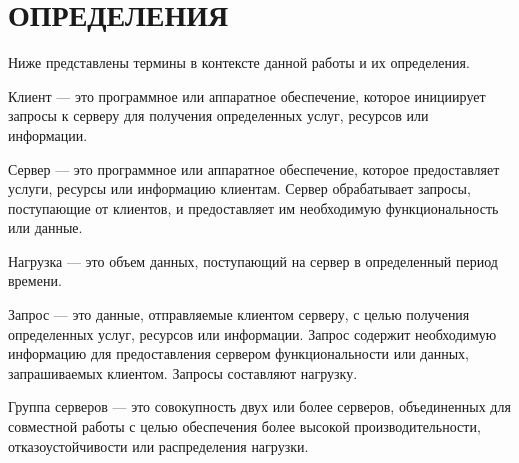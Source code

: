 \section*{ОПРЕДЕЛЕНИЯ}

Ниже представлены термины в контексте данной работы и их определения.

Клиент --- это программное или аппаратное обеспечение, которое инициирует запросы к серверу для получения определенных услуг, ресурсов или информации.

Сервер --- это программное или аппаратное обеспечение, которое предоставляет услуги, ресурсы или информацию клиентам. Сервер обрабатывает запросы, поступающие от клиентов, и предоставляет им необходимую функциональность или данные.

Нагрузка --- это объем данных, поступающий на сервер в определенный период времени.

Запрос --- это данные, отправляемые клиентом серверу, с целью получения определенных услуг, ресурсов или информации. Запрос содержит необходимую информацию для предоставления сервером функциональности или данных, запрашиваемых клиентом. Запросы составляют нагрузку.

Группа серверов --- это совокупность двух или более серверов, объединенных для совместной работы с целью обеспечения более высокой производительности, отказоустойчивости или распределения нагрузки.












